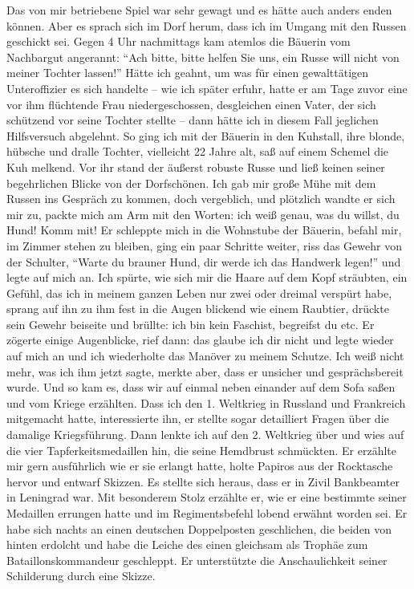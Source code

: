 \documentclass[a5paper,pagesize,10pt,twoside=true]{scrbook}
\renewcommand{\marginpar}[2][]{}
\begin{document}
Das von mir betriebene Spiel war sehr gewagt und es hätte auch anders enden können. Aber es sprach sich im Dorf herum, dass ich im Umgang mit den Russen geschickt \marginpar{75} sei. Gegen 4 Uhr nachmittags kam atemlos die Bäuerin vom Nachbargut angerannt: \enquote{Ach bitte, bitte helfen Sie uns, ein Russe will nicht von meiner Tochter lassen!} Hätte ich geahnt, um was für einen gewalttätigen Unteroffizier es sich handelte -- wie ich später erfuhr, hatte er am Tage zuvor eine vor ihm flüchtende Frau niedergeschossen, desgleichen einen Vater, der sich schützend vor seine Tochter stellte -- dann hätte ich in diesem Fall jeglichen Hilfsversuch abgelehnt. So ging ich mit der Bäuerin in den Kuhstall, ihre blonde, hübsche und dralle Tochter, vielleicht 22 Jahre alt, saß auf einem Schemel die Kuh melkend. Vor ihr stand der äußerst robuste Russe und ließ keinen seiner begehrlichen Blicke von der Dorfschönen. Ich gab mir große Mühe mit dem Russen ins Gespräch zu kommen, doch vergeblich, und plötzlich wandte er sich mir zu, packte mich am Arm mit den Worten: ich weiß genau, was du willst, du Hund! Komm mit! Er schleppte mich in die Wohnstube der Bäuerin, befahl mir, im Zimmer stehen zu bleiben, ging ein paar Schritte weiter, riss das Gewehr von der Schulter, \enquote{Warte du brauner Hund, dir werde ich das Handwerk legen!} und \marginpar{76} legte auf mich an. Ich spürte, wie sich mir die Haare auf dem Kopf sträubten, ein Gefühl, das ich in meinem ganzen Leben nur zwei oder dreimal verspürt habe, sprang auf ihn zu ihm fest in die Augen blickend wie einem Raubtier, drückte sein Gewehr beiseite und brüllte: ich bin kein Faschist, begreifst du etc. Er zögerte einige Augenblicke, rief dann: das glaube ich dir nicht und legte wieder auf mich an und ich wiederholte das Manöver zu meinem Schutze. Ich weiß nicht mehr, was ich ihm jetzt sagte, merkte aber, dass er unsicher und gesprächsbereit wurde. Und so kam es, dass wir auf einmal neben einander auf dem Sofa saßen und vom Kriege erzählten. Dass ich den 1. Weltkrieg in Russland und Frankreich mitgemacht hatte, interessierte ihn, er stellte sogar detailliert Fragen über die damalige Kriegsführung. Dann lenkte ich auf den 2. Weltkrieg über und wies auf die vier Tapferkeitsmedaillen hin, die seine Hemdbrust schmückten. Er erzählte mir gern ausführlich wie er sie erlangt hatte, holte Papiros aus der Rocktasche hervor und entwarf Skizzen. Es stellte sich heraus, dass er in Zivil Bankbeamter in Leningrad \marginpar{77} war. Mit besonderem Stolz erzählte er, wie er eine bestimmte seiner Medaillen errungen hatte und im Regimentsbefehl lobend erwähnt worden sei. Er habe sich nachts an einen deutschen Doppelposten geschlichen, die beiden von hinten erdolcht und habe die Leiche des einen gleichsam als Trophäe zum Bataillonskommandeur geschleppt. Er unterstützte die Anschaulichkeit seiner Schilderung durch eine Skizze.
\end{document}
